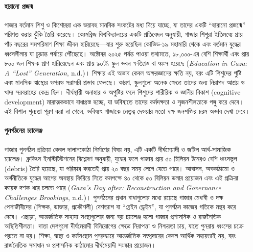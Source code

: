 \paragraph{\texorpdfstring{হারানো প্রজন্ম
}{৪.৬.১ হারানো প্রজন্ম }}\label{ux9b9ux9b0ux9a8-ux9aaux9b0ux99cux9a8ux9ae}

গাজার বর্তমান শিশু ও কিশোররা এক ভয়াবহ মানবিক সংকটের মধ্য দিয়ে যাচ্ছে, যা
তাদের একটি ``হারানো প্রজন্মে'' পরিণত করার ঝুঁকি তৈরি করেছে। ক্যেমব্রিজ
বিশ্ববিদ্যালয়ের একটি প্রতিবেদন অনুযায়ী, গাজার শিশুরা ইতিমধ্যে প্রায় পাঁচ বছরের
সমপরিমাণ শিক্ষা জীবন হারিয়েছে---যার শুরু হয়েছিল কোভিড-১৯ মহামারি থেকে এবং
বর্তমান যুদ্ধের ধ্বংসলীলায় যা চূড়ান্ত পর্যায়ে পৌঁছেছে। অক্টোবর ২০২৫ পর্যন্ত পাওয়া
তথ্যমতে, ১৮,০০০-এর বেশি শিক্ষার্থী এবং প্রায় ৮০০ জন শিক্ষক প্রাণ হারিয়েছেন এবং
প্রায় ৯০\% স্কুল ভবন ক্ষতিগ্রস্ত বা ধ্বংস হয়েছে (\emph{Education in Gaza: A
``Lost'' Generation}, n.d.)। শিক্ষার এই অভাব কেবল অক্ষরজ্ঞানের ক্ষতি নয়, বরং
এটি শিশুদের পুষ্টি এবং মানসিক স্বাস্থ্যের ওপরও সরাসরি প্রভাব ফেলছে। কারণ,
স্কুলগুলো অনেক ক্ষেত্রে তাদের জন্য নিরাপদ আশ্রয় ও খাদ্য সরবরাহের কেন্দ্র ছিল।
দীর্ঘস্থায়ী অনাহার ও অপুষ্টির ফলে শিশুদের শারীরিক ও জ্ঞানীয় বিকাশ (cognitive
development) মারাত্মকভাবে বাধাগ্রস্ত হচ্ছে, যা ভবিষ্যতে তাদের কর্মদক্ষতা ও
সৃজনশীলতাকে পঙ্গু করে দেবে। এই বিশাল শূন্যতা পূরণ করা না গেলে, ভবিষ্যৎ গাজাকে
নেতৃত্ব দেওয়ার মতো দক্ষ জনশক্তির চরম অভাব দেখা দেবে।

\paragraph{\texorpdfstring{পুনর্গঠনের চ্যালেঞ্জ
}{৪.৬.২ পুনর্গঠনের চ্যালেঞ্জ }}\label{ux9aaux9a8ux9b0ux997ux9a0ux9a8ux9b0-ux99aux9afux9b2ux99eux99c}

গাজার পুনর্গঠন প্রক্রিয়া কেবল দালানকোঠা নির্মাণের বিষয় নয়, এটি একটি
দীর্ঘমেয়াদী ও জটিল আর্থ-সামাজিক চ্যালেঞ্জ। ব্রুকিংস ইনস্টিটিউশনের বিশ্লেষণ
অনুযায়ী, যুদ্ধের ফলে গাজায় প্রায় ৫০ মিলিয়ন টনেরও বেশি ধ্বংসস্তূপ (debris) তৈরি
হয়েছে, যা পরিষ্কার করতেই প্রায় ২০ বছর সময় লেগে যেতে পারে। আবাসন, অবকাঠামো
ও অর্থনীতিকে যুদ্ধের আগের অবস্থায় ফিরিয়ে নিতে কমপক্ষে ৪০ থেকে ৫০ বিলিয়ন ডলার
প্রয়োজন এবং এই প্রক্রিয়া কয়েক দশক ধরে চলতে পারে (\emph{Gaza's Day after:
Reconstruction and Governance Challenges \textbar{} Brookings}, n.d.)।
পুনর্গঠনের প্রধান বাধাগুলোর মধ্যে রয়েছে গাজার মেধাবী ও দক্ষ পেশাজীবীদের
(শিক্ষক, ডাক্তার, প্রকৌশলী) দেশত্যাগ বা ``ব্রেইন ড্রেইন'', যা পুনর্গঠন কাজের
গতিকে মন্থর করে দেবে। এছাড়া, আন্তর্জাতিক সাহায্য সংস্থাগুলোর জন্য বড় চ্যালেঞ্জ
হলো গাজার প্রশাসনিক ও রাজনৈতিক অস্থিতিশীলতা। দাতা দেশগুলো দীর্ঘমেয়াদী
বিনিয়োগের ক্ষেত্রে নিরাপত্তা ও নিশ্চয়তা চায়, যাতে পুনরায় ধ্বংসের চক্রে পড়তে না
হয়। শিক্ষা, স্বাস্থ্য ও কর্মসংস্থান পুনরুদ্ধারে আন্তর্জাতিক সম্প্রদায়ের কেবল আর্থিক
সহায়তাই নয়, বরং রাজনৈতিক সমাধান ও প্রশাসনিক কাঠামোর দীর্ঘমেয়াদী সংস্কার
প্রয়োজন।

